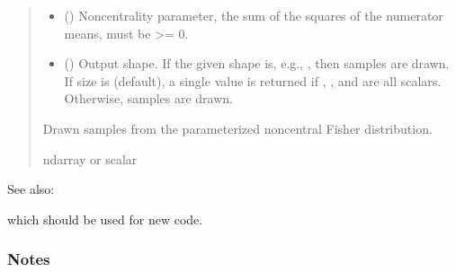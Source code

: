 \documentclass[letterpaper,10pt,english]{sphinxmanual}
\begin{document}
\begin{fulllineitems}
\begin{quote}
\begin{description}
\begin{itemize}
\item {} 
\sphinxAtStartPar
{} () \textendash{} Non\sphinxhyphen{}centrality parameter, the sum of the squares of the numerator
means, must be \textgreater{}= 0.

\item {} 
\sphinxAtStartPar
{} (\sphinxstyleliteralemphasis{\sphinxupquote{, }}) \textendash{} Output shape.  If the given shape is, e.g., , then
 samples are drawn.  If size is  (default),
a single value is returned if , , and 
are all scalars.  Otherwise, 
samples are drawn.

\end{itemize}

\sphinxAtStartPar
{} \textendash{} Drawn samples from the parameterized noncentral Fisher distribution.

\sphinxAtStartPar
ndarray or scalar

\end{description}\end{quote}


\begin{sphinxseealso}{See also:}
\begin{description}
\sphinxAtStartPar
which should be used for new code.

\end{description}


\end{sphinxseealso}

\subsubsection*{Notes}


\end{fulllineitems}
\end{document}
